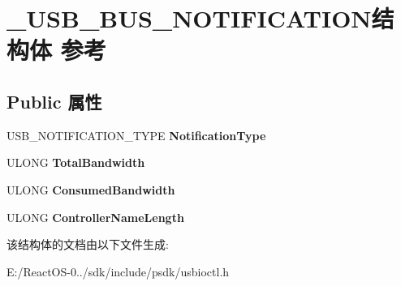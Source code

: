 \hypertarget{struct___u_s_b___b_u_s___n_o_t_i_f_i_c_a_t_i_o_n}{}\section{\+\_\+\+U\+S\+B\+\_\+\+B\+U\+S\+\_\+\+N\+O\+T\+I\+F\+I\+C\+A\+T\+I\+O\+N结构体 参考}
\label{struct___u_s_b___b_u_s___n_o_t_i_f_i_c_a_t_i_o_n}
\subsection*{Public 属性}
\begin{DoxyCompactItemize}
\item 
\mbox{\label{struct___u_s_b___b_u_s___n_o_t_i_f_i_c_a_t_i_o_n_a4eec740784810541b0992bb6623d5e6f}} 
U\+S\+B\+\_\+\+N\+O\+T\+I\+F\+I\+C\+A\+T\+I\+O\+N\+\_\+\+T\+Y\+PE {\bfseries Notification\+Type}
\item 
\mbox{\label{struct___u_s_b___b_u_s___n_o_t_i_f_i_c_a_t_i_o_n_a25978dab15cb2e86417e76a572df062c}} 
U\+L\+O\+NG {\bfseries Total\+Bandwidth}
\item 
\mbox{\label{struct___u_s_b___b_u_s___n_o_t_i_f_i_c_a_t_i_o_n_a6e2ae7d68e6a37d92d639a8862d0fd30}} 
U\+L\+O\+NG {\bfseries Consumed\+Bandwidth}
\item 
\mbox{\label{struct___u_s_b___b_u_s___n_o_t_i_f_i_c_a_t_i_o_n_a7a561f5af19e13205c7c059900bcad3e}} 
U\+L\+O\+NG {\bfseries Controller\+Name\+Length}
\end{DoxyCompactItemize}


该结构体的文档由以下文件生成\+:\begin{DoxyCompactItemize}
\item 
E\+:/\+React\+O\+S-\/0../sdk/include/psdk/usbioctl.\+h\end{DoxyCompactItemize}
